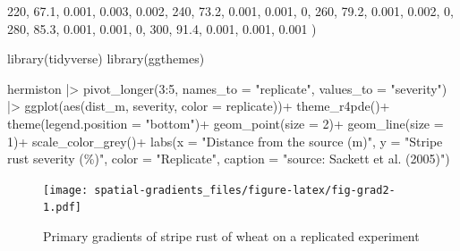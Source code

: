 \documentclass[
  letterpaper,
]{book}
\newenvironment{Shaded}{\begin{snugshade}}{\end{snugshade}}
\newcommand{\AttributeTok}[1]{\textcolor[rgb]{0.40,0.45,0.13}{#1}}
\newcommand{\DecValTok}[1]{\textcolor[rgb]{0.68,0.00,0.00}{#1}}
\newcommand{\FloatTok}[1]{\textcolor[rgb]{0.68,0.00,0.00}{#1}}
\newcommand{\FunctionTok}[1]{\textcolor[rgb]{0.28,0.35,0.67}{#1}}
\newcommand{\NormalTok}[1]{\textcolor[rgb]{0.00,0.23,0.31}{#1}}
\newcommand{\SpecialCharTok}[1]{\textcolor[rgb]{0.37,0.37,0.37}{#1}}
\newcommand{\StringTok}[1]{\textcolor[rgb]{0.13,0.47,0.30}{#1}}
\begin{document}
\begin{Shaded}
\begin{Highlighting}[]
  \DecValTok{220}\NormalTok{,   }\FloatTok{67.1}\NormalTok{, }\FloatTok{0.001}\NormalTok{, }\FloatTok{0.003}\NormalTok{, }\FloatTok{0.002}\NormalTok{,}
  \DecValTok{240}\NormalTok{,   }\FloatTok{73.2}\NormalTok{, }\FloatTok{0.001}\NormalTok{, }\FloatTok{0.001}\NormalTok{,     }\DecValTok{0}\NormalTok{,}
  \DecValTok{260}\NormalTok{,   }\FloatTok{79.2}\NormalTok{, }\FloatTok{0.001}\NormalTok{, }\FloatTok{0.002}\NormalTok{,     }\DecValTok{0}\NormalTok{,}
  \DecValTok{280}\NormalTok{,   }\FloatTok{85.3}\NormalTok{, }\FloatTok{0.001}\NormalTok{, }\FloatTok{0.001}\NormalTok{,     }\DecValTok{0}\NormalTok{,}
  \DecValTok{300}\NormalTok{,   }\FloatTok{91.4}\NormalTok{, }\FloatTok{0.001}\NormalTok{, }\FloatTok{0.001}\NormalTok{, }\FloatTok{0.001}
\NormalTok{  )}
\end{Highlighting}
\end{Shaded}

\begin{Shaded}
\begin{Highlighting}[]
\FunctionTok{library}\NormalTok{(tidyverse)}
\FunctionTok{library}\NormalTok{(ggthemes)}

\NormalTok{hermiston }\SpecialCharTok{|\textgreater{}} 
  \FunctionTok{pivot\_longer}\NormalTok{(}\DecValTok{3}\SpecialCharTok{:}\DecValTok{5}\NormalTok{, }\AttributeTok{names\_to =} \StringTok{"replicate"}\NormalTok{, }\AttributeTok{values\_to =} \StringTok{"severity"}\NormalTok{) }\SpecialCharTok{|\textgreater{}} 
  \FunctionTok{ggplot}\NormalTok{(}\FunctionTok{aes}\NormalTok{(dist\_m, severity, }\AttributeTok{color =}\NormalTok{ replicate))}\SpecialCharTok{+}
  \FunctionTok{theme\_r4pde}\NormalTok{()}\SpecialCharTok{+}
  \FunctionTok{theme}\NormalTok{(}\AttributeTok{legend.position =} \StringTok{"bottom"}\NormalTok{)}\SpecialCharTok{+}
  \FunctionTok{geom\_point}\NormalTok{(}\AttributeTok{size =} \DecValTok{2}\NormalTok{)}\SpecialCharTok{+}
  \FunctionTok{geom\_line}\NormalTok{(}\AttributeTok{size =} \DecValTok{1}\NormalTok{)}\SpecialCharTok{+}
  \FunctionTok{scale\_color\_grey}\NormalTok{()}\SpecialCharTok{+}
  \FunctionTok{labs}\NormalTok{(}\AttributeTok{x =} \StringTok{"Distance from the source (m)"}\NormalTok{,}
       \AttributeTok{y =} \StringTok{"Stripe rust severity (\%)"}\NormalTok{,}
       \AttributeTok{color =} \StringTok{"Replicate"}\NormalTok{,}
       \AttributeTok{caption =} \StringTok{"source: Sackett et al. (2005)"}\NormalTok{)}
\end{Highlighting}
\end{Shaded}

\begin{figure}

\texttt{[image: spatial-gradients\_files/figure-latex/fig-grad2-1.pdf]} \hfill{}

\caption{\label{fig-grad2}Primary gradients of stripe rust of wheat on a
replicated experiment}

\end{figure}
\end{document}
